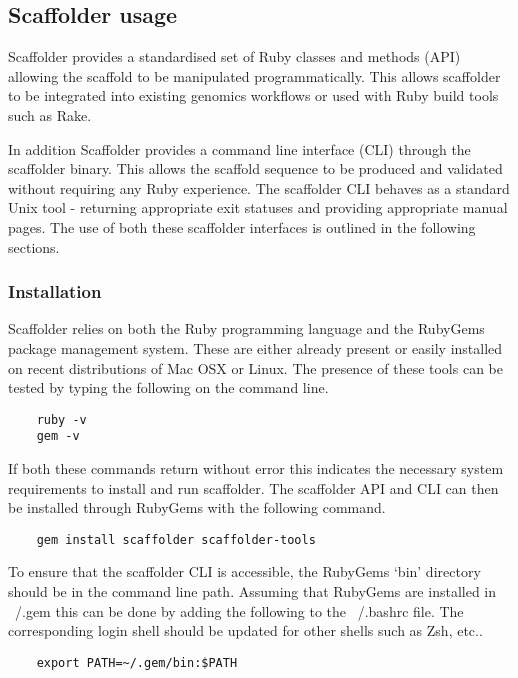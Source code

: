 \documentclass[10pt]{bmc_article}
\newenvironment{bmcformat}{\begin{raggedright}\baselineskip20pt\sloppy\setboolean{publ}{false}}{\end{raggedright}\baselineskip20pt\sloppy}
\begin{document}
\begin{bmcformat}
\subsection*{Scaffolder usage} %

Scaffolder provides a standardised set of Ruby classes and methods (API)
allowing the scaffold to be manipulated programmatically. This allows
scaffolder to be integrated into existing genomics workflows or used with Ruby
build tools such as Rake. \pb

In addition Scaffolder provides a command line interface (CLI) through the
scaffolder binary. This allows the scaffold sequence to be produced and
validated without requiring any Ruby experience. The scaffolder CLI behaves as
a standard Unix tool - returning appropriate exit statuses and providing
appropriate manual pages. The use of both these scaffolder interfaces is
outlined in the following sections. \pb

\subsubsection*{Installation} %

Scaffolder relies on both the Ruby programming language and the RubyGems
package management system. These are either already present or easily
installed on recent distributions of Mac OSX or Linux. The presence of these
tools can be tested by typing the following on the command line. \pb

  \begin{verbatim}
    ruby -v
    gem -v
  \end{verbatim}

If both these commands return without error this indicates the necessary
system requirements to install and run scaffolder. The scaffolder API and CLI
can then be installed through RubyGems with the following command. \pb

  \begin{verbatim}
    gem install scaffolder scaffolder-tools
  \end{verbatim}

To ensure that the scaffolder CLI is accessible, the RubyGems `bin' directory
should be in the command line path. Assuming that RubyGems are installed in
~/.gem this can be done by adding the following to the ~/.bashrc file. The
corresponding login shell should be updated for other shells such as Zsh, etc..
\pb

  \begin{verbatim}
    export PATH=~/.gem/bin:$PATH
  \end{verbatim}


\end{bmcformat}
\end{document}
